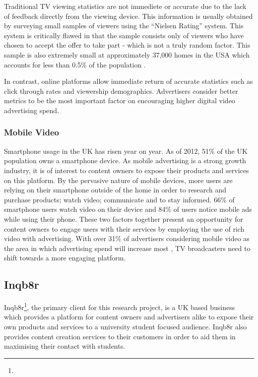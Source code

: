 	Traditional TV viewing statistics are not immediete or accurate due to the lack of feedback directly from the viewing device. This information is usually obtained by surveying small samples of viewers using the ``Nielsen Rating'' system. This system is critically flawed in that the sample consists only of viewers who have chosen to accept the offer to take part - which is not a truly random factor. This sample is also extremely small at approximately 37,000 homes in the USA which accounts for less than 0.5\% of the population \citep{nielsen-sample}.

	In contrast, online platforms allow immediate return of accurate statistics such as click through rates and viewership demographics. Advertisers consider better metrics to be the most important factor on encouraging higher digital video advertising spend.

	\subsubsection{Mobile Video}

	Smartphone usage in the UK has risen year on year. As of 2012, 51\% of the UK population owns a smartphone device. As mobile advertising is a strong growth industry, it is of interest to content owners to expose their products and services on this platform. By the pervasive nature of mobile devices, more users are relying on their smartphone outside of the home in order to research and purchase products; watch video; communicate and to stay informed. 66\% of smartphone users watch video on their device and 84\% of users notice mobile ads while using their phone. \citep{mobile-planet} These two factors together present an opportunity for content owners to engage users with their services by employing the use of rich video with advertising. With over 31\% of advertisers considering mobile video as the area in which advertising spend will increase most \citep{brightroll-report}, TV broadcasters need to shift towards a more engaging platform.


	\subsection{Inqb8r}

	Inqb8r\footnote{}, the primary client for this research project, is a UK based business which provides a platform for content owners and advertisers alike to expose their own products and services to a university student focused audience. Inqb8r also provides content creation services to their customers in order to aid them in maximising their contact with students.

